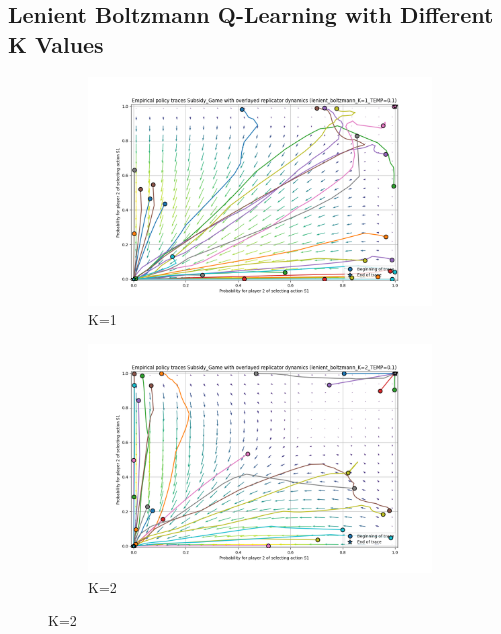 \documentclass[12pt,a4paper, onecolumn]{exam}
\begin{document}
\begin{appendices}
    \subsection{Lenient Boltzmann Q-Learning with Different K Values}

    \begin{figure}[H]
        \centering
        \begin{subfigure}{0.44\textwidth}
            \centering
            \includegraphics[width=\linewidth]{plots/replicator_trajectoreis_Subsidy_Game_lenient_boltzmann_K=1_TEMP=0.1.png}
            \caption{K=1}
        \end{subfigure}
        \hfill
        \begin{subfigure}{0.44\textwidth}
            \centering
            \includegraphics[width=\linewidth]{plots/replicator_trajectoreis_Subsidy_Game_lenient_boltzmann_K=2_TEMP=0.1.png}
            \caption{K=2}

\end{subfigure}
\end{figure}
\end{appendices}
\end{document}
